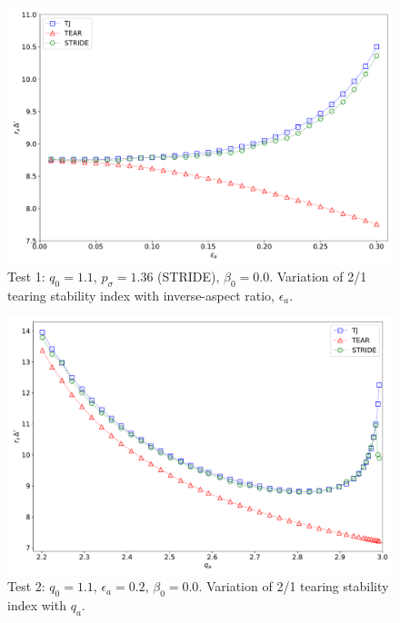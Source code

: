 \documentclass[12pt,prb,aps,notitlepage]{revtex4-1}
\begin{document}
\newpage
\begin{figure}
\centerline{\includegraphics[width=\textwidth]{Test1.pdf}}
\caption{Test 1: $q_0=1.1$, $p_\sigma=1.36$ (STRIDE), $\beta_0=0.0$. Variation of 2/1 tearing stability index with inverse-aspect ratio, $\epsilon_a$. }
\end{figure}

\newpage
\begin{figure}
\centerline{\includegraphics[width=\textwidth]{Test2.pdf}}
\caption{Test 2: $q_0=1.1$, $\epsilon_a=0.2$, $\beta_0=0.0$. Variation of 2/1 tearing stability index with $q_a$. }
\end{figure}
\end{document}
